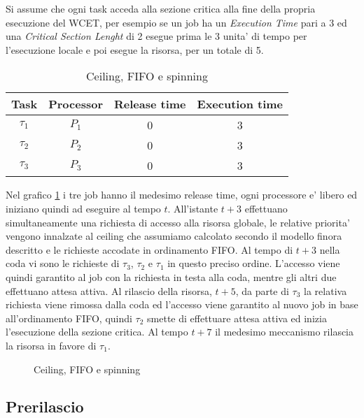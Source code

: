 \documentclass[a4paper,11pt]{article}
\begin{document}
\noindent Si assume che ogni task acceda alla sezione critica alla fine della propria esecuzione del WCET, per esempio se un job ha un \textit{Execution Time} pari a 3 ed una \textit{Critical Section Lenght} di 2 esegue prima le 3 unita' di tempo per l'esecuzione locale e poi esegue la risorsa, per un totale di 5.\\

\begin{table}
	\centering
	\begin{tabular}{cccc}
	\hline\hline
    Task    & Processor & Release time & Execution time \\ \hline
    $\tau_1$ & $P_1$  & 0            & 3              \\
    $\tau_2$ & $P_2$  & 0            & 3              \\
    $\tau_3$ & $P_3$  & 0            & 3              \\
	\hline
    \end{tabular}
	\caption{Ceiling, FIFO e spinning}
	\label{table:primo taskset} 
\end{table}

\noindent Nel grafico \ref{first} i tre job hanno il medesimo release time, ogni processore e' libero ed iniziano quindi ad eseguire al tempo $t$. All'istante $t + 3$ effettuano simultaneamente una richiesta di accesso alla risorsa globale, le relative priorita' vengono innalzate al ceiling che assumiamo calcolato secondo il modello finora descritto e le richieste accodate in ordinamento FIFO. Al tempo di $t + 3$ nella coda vi sono le richieste di $\tau_3$, $\tau_2$ e $\tau_1$ in questo preciso ordine. L'accesso viene quindi garantito al job con la richiesta in testa alla coda, mentre gli altri due effettuano attesa attiva. Al rilascio della risorsa, $t + 5$, da parte di $\tau_3$ la relativa richiesta viene rimossa dalla coda ed l'accesso viene garantito al nuovo job in base all'ordinamento FIFO, quindi $\tau_2$ smette di effettuare attesa attiva ed inizia l'esecuzione della sezione critica. Al tempo $t + 7$ il medesimo meccanismo rilascia la risorsa in favore di $\tau_1$.\\

\begin{figure}[t]
	\centering
	\ModelloConcettualeOne
	\caption{Ceiling, FIFO e spinning}
	\label{first}
\end{figure}

\subsection{Prerilascio}
\end{document}
